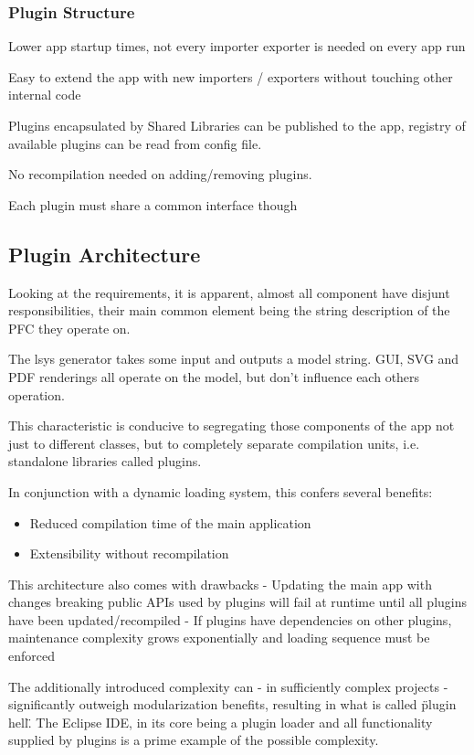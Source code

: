 \subsubsection{Plugin Structure}
Lower app startup times, not every importer exporter is needed on every app run

Easy to extend the app with new importers / exporters without touching other internal code

Plugins encapsulated by Shared Libraries can be published to the app, registry of available plugins can be read from config file.

No recompilation needed on adding/removing plugins.

Each plugin must share a common interface though

\subsection{Plugin Architecture}
Looking at the requirements, it is apparent, almost all component have disjunt responsibilities, their main common element being the string description of the PFC they operate on.

The \gls{lsys} generator takes some input and outputs a model string. GUI, SVG and PDF renderings all operate on the model, but don't influence each others operation.

This characteristic is conducive to segregating those components of the app not just to different classes, but to completely separate compilation units, i.e. standalone libraries called plugins.

In conjunction with a dynamic loading system, this confers several benefits:

\begin{itemize}
	\item  Reduced compilation time of the main application
	\item  Extensibility without recompilation
\end{itemize}

This architecture also comes with drawbacks
- Updating the main app with changes breaking public APIs used by plugins will fail at runtime until all plugins have been updated/recompiled
- If plugins have dependencies on other plugins, maintenance complexity grows exponentially and loading sequence must be enforced

The additionally introduced complexity can - in sufficiently complex projects - significantly outweigh modularization benefits, resulting in what is called \"plugin hell\". %
The Eclipse IDE, in its core being a plugin loader and all functionality supplied by plugins is a prime example of the possible complexity.

